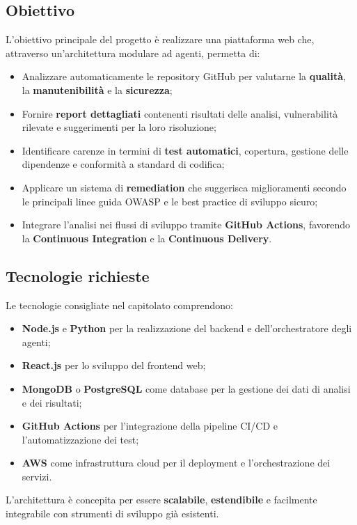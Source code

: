 \documentclass[a4paper,12pt]{article}
\begin{document}
{{    \subsection{Obiettivo}
        L’obiettivo principale del progetto è realizzare una piattaforma web che, attraverso un’architettura modulare ad agenti, permetta di:
        \begin{itemize}
            \item Analizzare automaticamente le repository GitHub per valutarne la \textbf{qualità}, la \textbf{manutenibilità} e la \textbf{sicurezza};
            \item Fornire \textbf{report dettagliati} contenenti risultati delle analisi, vulnerabilità rilevate e suggerimenti per la loro risoluzione;
            \item Identificare carenze in termini di \textbf{test automatici}, copertura, gestione delle dipendenze e conformità a standard di codifica;
            \item Applicare un sistema di \textbf{remediation} che suggerisca miglioramenti secondo le principali linee guida OWASP e le best practice di sviluppo sicuro;
            \item Integrare l’analisi nei flussi di sviluppo tramite \textbf{GitHub Actions}, favorendo la \textbf{Continuous Integration} e la \textbf{Continuous Delivery}.
        \end{itemize}
    

    \subsection{Tecnologie richieste}
        Le tecnologie consigliate nel capitolato comprendono:
        \begin{itemize}
            \item \textbf{Node.js} e \textbf{Python} per la realizzazione del backend e dell’orchestratore degli agenti;
            \item \textbf{React.js} per lo sviluppo del frontend web;
            \item \textbf{MongoDB} o \textbf{PostgreSQL} come database per la gestione dei dati di analisi e dei risultati;
            \item \textbf{GitHub Actions} per l’integrazione della pipeline CI/CD e l’automatizzazione dei test;
            \item \textbf{AWS} come infrastruttura cloud per il deployment e l’orchestrazione dei servizi.
        \end{itemize}
        L’architettura è concepita per essere \textbf{scalabile}, \textbf{estendibile} e facilmente integrabile con strumenti di sviluppo già esistenti.
    

}}
\end{document}
